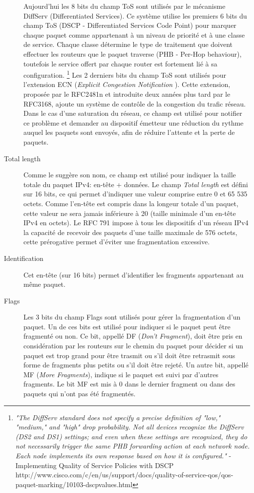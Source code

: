 \begin{description}
Aujourd'hui les 8 bits du champ ToS sont utilisés par le mécanisme DiffServ
(Differentiated Services). Ce système utilise les premiers 6 bits du champ
ToS (DSCP - Differentiated Services Code Point) pour marquer chaque paquet
comme appartenant à un niveau de priorité et à une classe de service. Chaque
classe détermine le type de traitement que doivent effectuer les routeurs que le paquet traverse
 (PHB - Per-Hop behaviour), toutefois le service offert
par chaque router est fortement lié à sa configuration.
\footnote {
{\it "The DiffServ standard does not specify a precise definition of "low," "medium,"
and "high" drop probability. Not all devices recognize the DiffServ (DS2 and
DS1) settings; and even when these settings are recognized, they do not
necessarily trigger the same PHB forwarding action at each network node. Each
node implements its own response based on how it is configured."} - 
Implementing Quality of Service Policies with DSCP
http://www.cisco.com/c/en/us/support/docs/quality-of-service-qos/qos-paquet-marking/10103-dscpvalues.html}
Les 2 derniers bits du champ ToS sont utilisés pour l'extension ECN ({\it Explicit Congestion
Notification }). Cette extension, proposée par le RFC2481n et introduite deux années plus tard par le RFC3168,
ajoute un système de contrôle de la congestion du trafic réseau. Dans le cas d'une saturation
du réseau, ce champ est utilisé pour notifier ce problème et demander au dispositif émetteur
une réduction du rythme auquel les paquets sont envoyés, afin de réduire l'attente et
la perte de paquets.

\item [Total length]
Comme le suggère son nom, ce champ est utilisé pour indiquer la taille totale du
paquet IPv4: en-tête + données. Le champ {\it Total length} est défini sur 16
bits, ce qui permet d'indiquer une valeur comprise entre 0 et 65 535 octets. Comme l'en-tête
est compris dans la longeur totale d'un paquet, cette valeur ne sera jamais inférieure
à 20 (taille minimale d'un en-tête IPv4 en octets).
Le RFC 791 impose à tous les dispositifs d'un réseau IPv4 la capacité de recevoir
des paquets d'une taille maximale de 576 octets, cette prérogative permet d'éviter une fragmentation excessive.

\item [Identification]
Cet en-tête (sur 16 bits) permet d'identifier les fragments appartenant au même paquet.

\item [Flags]
Les 3 bits du champ Flags sont utilisés pour gérer la fragmentation d'un paquet.
Un de ces bits est utilisé pour indiquer si le paquet peut être fragmenté ou
non. Ce bit, appellé DF ({\it Don't Fragment}), doit être pris en considération
par les routeurs sur le chemin du paquet pour décider si un paquet est trop grand pour être
trasmit ou s'il doit être retrasmit sous forme de fragments plus petits ou s'il doit être rejeté. 
Un autre bit, appellé MF ({\it More Fragments}), indique si le paquet est suivi 
par d'autres fragments. Le bit MF est mis à 0 dans le dernier fragment ou dans
des paquets qui n'ont pas été fragmentés.


\end{description}
